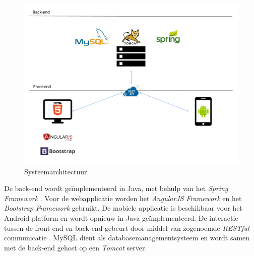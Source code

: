 \documentclass[a4paper]{article}
\begin{document}
\begin{figure}[H]
  \includegraphics[width=\textwidth]{technologie_stack}
  \caption{Systeemarchitectuur}
  \label{fig:Systeemarchitectuur}
\end{figure}

De back-end wordt geïmplementeerd in Java, met behulp van het \textit{Spring Framework} \cite{Spring}. Voor de webapplicatie worden het \textit{AngularJS Framework} \cite{AngularJS} en het \textit{Bootstrap Framework} \cite{Bootstrap} gebruikt. De mobiele applicatie is beschikbaar voor het Android platform en wordt opnieuw in Java geïmplementeerd. De interactie tussen de front-end en back-end gebeurt door middel van zogenoemde \textit{RESTful} communicatie \cite{REST}. MySQL \cite{MySQL} dient als databasemanagementsysteem en wordt samen met de back-end gehost op een \textit{Tomcat} \cite{Tomcat} server.

\newpage
\end{document}
